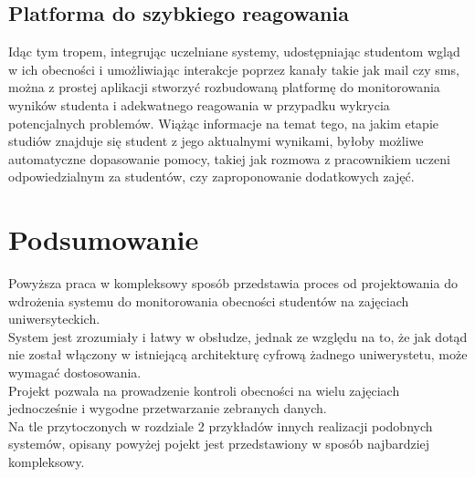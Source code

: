\documentclass[declaration,shortabstract, mgr]{iithesis}
\begin{document}
\section{Platforma do szybkiego reagowania}
\indent Idąc tym tropem, integrując uczelniane systemy, udostępniając studentom wgląd w ich obecności i umożliwiając interakcje poprzez kanały takie jak mail czy sms, można z prostej aplikacji stworzyć rozbudowaną platformę do monitorowania wyników studenta i adekwatnego reagowania w przypadku wykrycia potencjalnych problemów. Wiążąc informacje na temat tego, na jakim etapie studiów znajduje się student z jego aktualnymi wynikami, byłoby możliwe automatyczne dopasowanie pomocy, takiej jak rozmowa z pracownikiem uczeni odpowiedzialnym za studentów, czy zaproponowanie dodatkowych zajęć.

\chapter{Podsumowanie}
\indent Powyższa praca w kompleksowy sposób przedstawia proces od projektowania do wdrożenia systemu do monitorowania obecności studentów na zajęciach uniwersyteckich. \\
\indent System jest zrozumiały i łatwy w obsłudze, jednak ze względu na to, że jak dotąd nie został włączony w istniejącą architekturę cyfrową żadnego uniwerystetu, może wymagać dostosowania. \\
\indent Projekt pozwala na prowadzenie kontroli obecności na wielu zajęciach jednocześnie i wygodne przetwarzanie zebranych danych.\\
\indent Na tle przytoczonych w rozdziale 2 przykładów innych realizacji podobnych systemów, opisany powyżej pojekt jest przedstawiony w sposób najbardziej kompleksowy.
\end{document}
